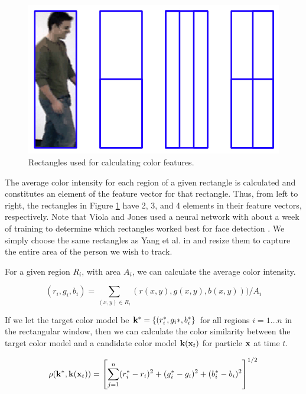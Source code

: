 \documentclass[11pt]{article}
\begin{document}
\begin{figure}[H]
\centering
\includegraphics[scale=.4]{img/RectFeatures.jpg}
\caption{Rectangles used for calculating color features.}
\label{fig:rectfeatures}
\end{figure}

The average color intensity for each region of a given rectangle is calculated and constitutes an element of the feature vector for that rectangle. Thus, from left to right, the rectangles in Figure \ref{fig:rectfeatures} have 2, 3, and 4 elements in their feature vectors, respectively. Note that Viola and Jones used a neural network with about a week of training to determine which rectangles worked best for face detection \cite{facedetection}. We simply choose the same rectangles as Yang et al. in \cite{hybrid} and resize them to capture the entire area of the person we wish to track.

For a given region $R_i$, with area $A_i$, we can calculate the average color intensity.

\begin{equation}
(r_i,g_i,b_i) = \sum_{(x,y) \in R_i} (r(x,y), g(x,y), b(x,y))) / A_i
\label{eq:colorregionsum}
\end{equation}

If we let the target color model be ${\bf k}^* = \{ (r_i^*, g_i*, b_i^* \}$ for all regions $i = 1 \dots n$ in the rectangular window, then we can calculate the color similarity between the target color model and a candidate color model ${\bf k}({\bf x}_t)$ for particle ${\bf x}$ at time $t$.

\begin{equation}
\rho({\bf k}^*, {\bf k}({\bf x}_t)) = \left [ \sum^n_{j = 1} (r_i^* - r_i)^2 + (g_i^* - g_i)^2 + (b_i^* - b_i)^2 \right ] ^{1/2}
\label{eq:colorsimilarity}
\end{equation}
\end{document}
